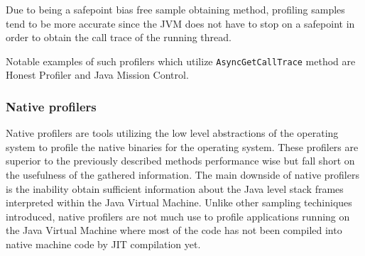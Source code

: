 \documentclass[..thesis.tex]{subfiles}
\begin{document}
Due to being a safepoint bias free sample obtaining method, profiling samples tend to be more accurate since the JVM does not have to stop on a safepoint in order to obtain the call trace of the running thread. 

Notable examples of such profilers which utilize \texttt{Async\-Get\-Call\-Trace} method  are Honest Profiler and Java Mission Control. 

\subsubsection{Native profilers}
Native profilers are tools utilizing the low level abstractions of the operating system to  profile the native binaries for the operating system. These profilers are superior to the previously described methods performance wise but fall short on the usefulness of the gathered information. The main downside of native profilers is the inability obtain sufficient information about the Java level stack frames interpreted within the Java Virtual Machine. Unlike other sampling techiniques introduced, native profilers are not much use to profile applications running on the Java Virtual Machine where most of the code has not been compiled into native machine code by JIT compilation yet.


\end{document}
